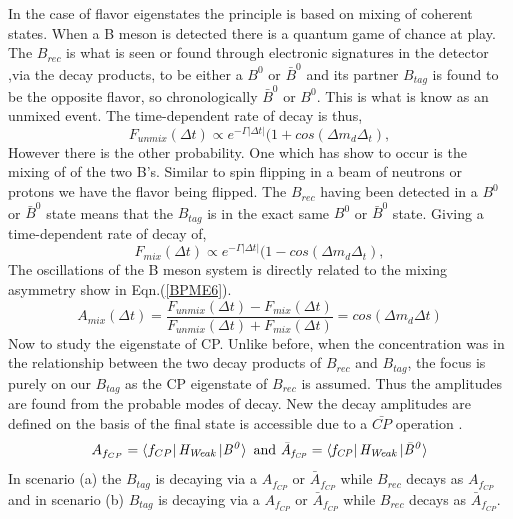 In the case of flavor eigenstates the principle is based on mixing of coherent states. When a B meson is detected there is a quantum game of chance at play. The $B_{rec}$ is what is seen or found through electronic signatures in the detector ,via the decay products, to be either a $B^0$ or $\bar{B}^0$ and its partner $B_{tag}$ is found to be the opposite flavor, so chronologically $\bar{B}^0$ or $B^0$. This is what is know as an unmixed event. The time-dependent rate of decay is thus,
\begin{equation}\label{BPME13}
F_{unmix}(\Delta t) \propto e^{-\Gamma\left|\Delta t\right|}(1 + cos(\Delta m_d \Delta_t),
\end{equation}
However there is the other probability. One which has show to occur is the mixing of of the two B's. Similar to spin flipping in a beam of neutrons or protons we have the flavor being flipped. The $B_{rec}$ having been detected in a $B^0$ or $\bar{B}^0$ state means that the $B_{tag}$ is in the exact same $B^0$ or $\bar{B}^0$ state. Giving a time-dependent rate of decay of,
\begin{equation}\label{BPME14}
F_{mix}(\Delta t) \propto e^{-\Gamma\left|\Delta t\right|}(1 - cos(\Delta m_d \Delta_t),
\end{equation}
The oscillations of the B meson system is directly related to the mixing asymmetry show in Eqn.(\ref{BPME6}).
\begin{equation}\label{BPME15}
A_{mix}(\Delta t) = \frac{F_{unmix}(\Delta t)-F_{mix}(\Delta t)}{F_{unmix}(\Delta t)+F_{mix}(\Delta t)} = cos(\Delta m_d\Delta t) 
\end{equation}
Now to study the eigenstate of CP. Unlike before, when the concentration was in the relationship between the two decay products of $B_{rec}$ and $B_{tag}$, the focus is purely on our $B_{tag}$ as the CP eigenstate of $B_{rec}$ is assumed. Thus the amplitudes are found from the probable modes of decay. New the decay amplitudes are defined on the basis of the final state is accessible due to a $\bar{CP}$ operation \cite{B10}.
\begin{equation}\label{BPME16}
A_{f_{CP}}=\bra{f_{CP}}\it{H_{Weak}}\ket{B^{0}} \mbox{ and } \bar{A}_{f_{CP}}=\bra{f_{CP}}\it{H_{Weak}}\ket{\bar{B}^{0}}
\end{equation}
In scenario (a) the $B_{tag}$ is decaying via a $A_{f_{CP}}$ or $\bar{A}_{f_{CP}}$ while $B_{rec}$ decays as $A_{f_{CP}}$ and in scenario (b) $B_{tag}$ is decaying via a $A_{f_{CP}}$ or $\bar{A}_{f_{CP}}$ while $B_{rec}$ decays as $\bar{A}_{f_{CP}}$. 

